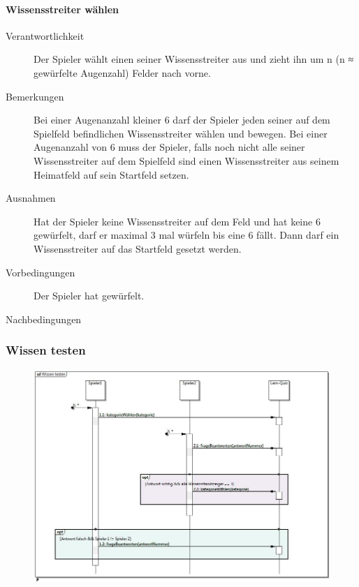 \documentclass{report}
\begin{document}
\paragraph{Wissensstreiter wählen}
\begin{description}
	\item[Verantwortlichkeit] Der Spieler wählt einen seiner Wissensstreiter aus und zieht ihn um n (n ≈ gewürfelte Augenzahl) Felder nach vorne.
	\item[Bemerkungen] Bei einer Augenanzahl kleiner 6 darf der Spieler jeden seiner auf dem Spielfeld befindlichen Wissensstreiter wählen und bewegen. Bei einer Augenanzahl von 6 muss der Spieler, falls noch nicht alle seiner Wissensstreiter auf dem Spielfeld sind einen Wissensstreiter aus seinem Heimatfeld auf sein Startfeld setzen.
	\item[Ausnahmen] Hat der Spieler keine Wissensstreiter auf dem Feld und hat keine 6 gewürfelt, darf er maximal 3 mal würfeln bis eine 6 fällt. Dann darf ein Wissensstreiter auf das Startfeld gesetzt werden.
	\item[Vorbedingungen] Der Spieler hat gewürfelt.
	\item[Nachbedingungen]
\end{description}



\subsubsection{Wissen testen}
\begin{figure}[H]
	\includegraphics[width=\textwidth]{Diagramme/SequenceDiagram-WissenTesten.jpg}
	\centering
\end{figure}
\end{document}
